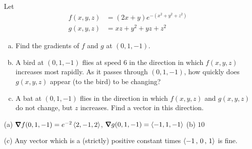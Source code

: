 \begin{question}[M200 2011A] %
Let
\begin{align*}
f(x, y, z) &= (2x + y)e^{-(x^2 +y^2 +z^2)} \\
g(x, y, z) &= xz + y^2 + yz + z^2 
\end{align*}
\begin{enumerate}[(a)]
\item
Find the gradients of $f$ and $g$ at $(0,1,-1)$.
\item
A bird at $(0,1,-1)$ flies at speed $6$ in the direction in which $f(x, y, z)$ increases 
most rapidly. As it passes through $(0,1,-1)$, how quickly does $g(x, y, z)$ appear (to the bird) 
to be changing?
\item
A bat at $(0,1,-1)$ flies in the direction in which $f (x, y, z)$ and $g(x, y, z)$ do not change,
but $z$ increases. Find a vector in this direction.
\end{enumerate}
\end{question}

%

\begin{answer}
(a) $\vnabla f(0,1,-1) =e^{-2}\llt 2,-1,2\rgt$, 
    $\vnabla g(0,1,-1) =\llt -1,1,-1\rgt$\qquad
(b) $10$

(c) Any vector which is a (strictly)
positive constant times $\left< -1 \,,\, 0 \,,\, 1 \right>$ is fine.
\end{answer}

